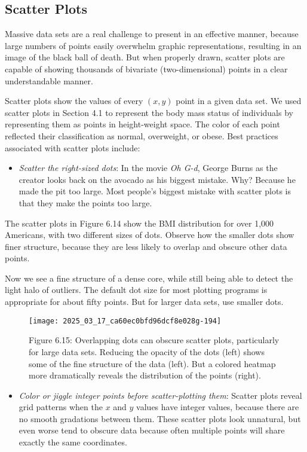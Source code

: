 \documentclass[10pt]{article}
\begin{document}
\subsection*{Scatter Plots}
Massive data sets are a real challenge to present in an effective manner, because large numbers of points easily overwhelm graphic representations, resulting in an image of the black ball of death. But when properly drawn, scatter plots are capable of showing thousands of bivariate (two-dimensional) points in a clear understandable manner.

Scatter plots show the values of every \((x, y)\) point in a given data set. We used scatter plots in Section 4.1 to represent the body mass status of individuals by representing them as points in height-weight space. The color of each point reflected their classification as normal, overweight, or obese. Best practices associated with scatter plots include:

\begin{itemize}
  \item \textit{Scatter the right-sized dots}: In the movie \textit{Oh G-d}, George Burns as the creator looks back on the avocado as his biggest mistake. Why? Because he made the pit too large. Most people's biggest mistake with scatter plots is that they make the points too large.
\end{itemize}

The scatter plots in Figure 6.14 show the BMI distribution for over 1,000 Americans, with two different sizes of dots. Observe how the smaller dots show finer structure, because they are less likely to overlap and obscure other data points.

Now we see a fine structure of a dense core, while still being able to detect the light halo of outliers. The default dot size for most plotting programs is appropriate for about fifty points. But for larger data sets, use smaller dots.

\begin{figure}[h!]
\centering
\texttt{[image: 2025\_03\_17\_ca60ec0bfd96dcf8e028g-194]}
\caption{Figure 6.15: Overlapping dots can obscure scatter plots, particularly for large data sets. Reducing the opacity of the dots (left) shows some of the fine structure of the data (left). But a colored heatmap more dramatically reveals the distribution of the points (right).}
\end{figure}

\begin{itemize}
  \item \textit{Color or jiggle integer points before scatter-plotting them}: Scatter plots reveal grid patterns when the \( x \) and \( y \) values have integer values, because there are no smooth gradations between them. These scatter plots look unnatural, but even worse tend to obscure data because often multiple points will share exactly the same coordinates.
\end{itemize}
\end{document}
